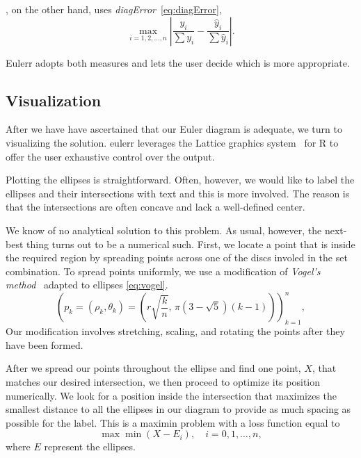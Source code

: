 \documentclass[a4paper,nofonts,nobib,titlepage,justified,marginals=raggedouter,nohyper]{tufte-handout}\usepackage[]{graphicx}\usepackage[]{color}
\newcommand{\pkg}[1]{{\fontseries{b}\selectfont #1}}
\begin{document}
\citet{micallef_2014}, on the other hand, uses \emph{diagError}~\eqref{eq:diagError},
\begin{equation}
\max_{i = 1, 2, \dots, n} \left| \frac{y_i}{\sum y_i} -
  \frac{\hat{y}_i}{\sum \hat{y}_i} \right|.
\label{eq:diagError}
\end{equation}

Eulerr adopts both measures and lets the user decide which is more appropriate.

\subsection{Visualization}

After we have have ascertained that our Euler diagram is adequate, we turn
to visualizing the solution. \pkg{eulerr}
leverages the \pkg{Lattice} graphics system~\citep{sarkar_2008} for \pkg{R} to offer the
user exhaustive control over the output.

Plotting the ellipses is straightforward. Often, however, we would like to label
the ellipses and their intersections with text and this is more involved. The
reason is that the intersections are often concave and lack a well-defined
center.

We know of no analytical solution to this problem. As usual, however,
the next-best thing turns out to be a numerical such. First, we locate a
point that is inside the required region by spreading points across one of the
discs involed in the set combination. To spread points uniformly, we use a
modification of \emph{Vogel's method}~\citep{arthur_2015,vogel_1979} adapted to
ellipses \cref{eq:vogel}.
\begin{equation}
\left( p_k = (\rho_k, \theta_k) = \left( r \sqrt{\frac{k}{n}},\, \pi (3 - \sqrt{5})(k - 1) \right) \right)_{k=1}^n,
\label{eq:vogel}
\end{equation}
Our modification involves stretching, scaling, and rotating the points
after they have been formed.

After we spread our points throughout the ellipse and find one point, $X$, that
matches our desired intersection, we then proceed to optimize
its position numerically. We look for a position inside the intersection that
maximizes the smallest distance to all the ellipses in our diagram to provide
as much spacing as possible for the label. This is a maximin problem with
a loss function equal to
\begin{equation}
\max{\min{(X-E_i)}},\quad i=0,1, \dots, n,
\label{eq:lossDist}
\end{equation}
where $E$ represent the ellipses.
\end{document}
